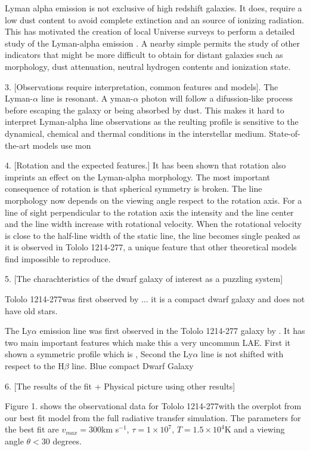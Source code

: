 \documentclass[a4paper, usenatbib, 12pt]{article}
\newcommand{\tol}{Tololo 1214-277}
\newcommand{\kms}{km s$^{-1}$}
\begin{document}
{Lyman alpha emission is not exclusive of high redshift galaxies. It
does, require a low dust content to avoid complete extinction and an
source of ionizing radiation.  This has motivated the creation of
local Universe surveys to perform a detailed study of the Lyman-alpha
emission \cite{LARS}. A nearby simple permits the study of other
indicators that might be more difficult to obtain for distant galaxies
such as morphology, dust attenuation, neutral hydrogen contents and
ionization state. 


3. [Observations require interpretation, common features and
  models]. The Lyman-$\alpha$ line is resonant. A yman-$\alpha$ photon
will follow a difussion-like process before escaping the galaxy or
being absorbed by dust. This makes it hard to interpret Lyman-alpha
line observations as the reulting profile is sensitive to the
dynamical, chemical and thermal conditions in the interstellar
medium. State-of-the-art models use mon

4. [Rotation and the expected features.]
It has been shown that rotation also imprints an effect on the
Lyman-alpha morphology. 
The most important consequence of rotation is that spherical 
symmetry is broken.
The line morphology now depends on the viewing angle respect to the
rotation axis.  
For a line of sight perpendicular to the rotation axis the intensity
and the line center and the line width increase with rotational
velocity.  
When the rotational velocity is close to the half-line width of the
static line, the line becomes single peaked as it is observed in
\tol, a unique feature that other theoretical models find
impossible to reproduce.


5. [The charachteristics of the dwarf galaxy of interest as a puzzling
system]

\tol was first observed by ... it is a compact 
dwarf galaxy and does not have old stars. 

The Ly$\alpha$ emission line was first observed in the \tol
galaxy by \cite{Thuan97}. It has two main important features which 
make this a very uncommun LAE. First it shown a symmetric profile 
which is , Second the Ly$\alpha$ line is not shifted with respect to 
the H$\beta$ line.  Blue compact Dwarf Galaxy


6. [The results of the fit + Physical picture using other results]

Figure 1. shows the observational data for \tol with the overplot from
our best fit model from the full radiative transfer simulation. 
The parameters for the best fit are
$v_{max}=300$\kms, $\tau=1\times10^7$, $T=1.5\times 10^{4}$K and a
viewing angle $\theta<30$ degrees. 

}
\end{document}
